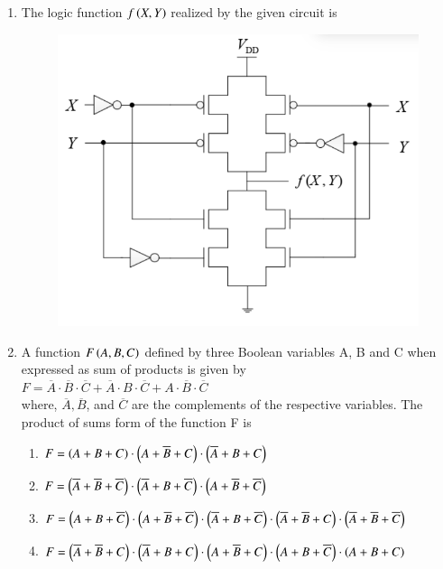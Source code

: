 \documentclass[a4paper, 11pt]{article}
\begin{document}
\begin{enumerate}
    \hfill{}
    
    \item The logic function $f\left(X,Y\right)$ realized by the given circuit is
    \begin{figure}[H]
        \centering
        \includegraphics[width=0.5\columnwidth]{figs/q8.png}
        \caption*{}
        \label{fig:q8}
    \end{figure}
    \begin{enumerate}
    \end{enumerate}

    \hfill{}

    \item A function $F\left(A,B,C\right)$ defined by three Boolean variables A, B and C when expressed as sum of products is given by\\$F = \overline{A} \cdot \overline{B} \cdot \overline{C} + \overline{A} \cdot B \cdot \overline{C} + A \cdot \overline{B} \cdot \overline{C}$\\where, $\overline{A}, \overline{B}$, and $\overline{C}$ are the complements of the respective variables. The product of sums  form of the function F is
    \begin{enumerate}
        \item $F = \left(A+B+C\right) \cdot \left(A+\overline{B}+C\right) \cdot \left(\overline{A}+B+C\right)$
        \item $F = \left(\overline{A}+\overline{B}+\overline{C}\right) \cdot \left(\overline{A}+B+\overline{C}\right) \cdot \left(A+\overline{B}+\overline{C}\right)$
        \item $F = \left(A+B+\overline{C}\right) \cdot \left(A+\overline{B}+\overline{C}\right) \cdot \left(\overline{A}+B+\overline{C}\right) \cdot \left(\overline{A}+\overline{B}+C\right) \cdot \left(\overline{A}+\overline{B}+\overline{C}\right)$
        \item $F = \left(\overline{A}+\overline{B}+C\right) \cdot \left(\overline{A}+B+C\right) \cdot \left(A+\overline{B}+C\right) \cdot \left(A+B+\overline{C}\right) \cdot \left(A+B+C\right)$
    \end{enumerate}


\end{enumerate}
\end{document}
